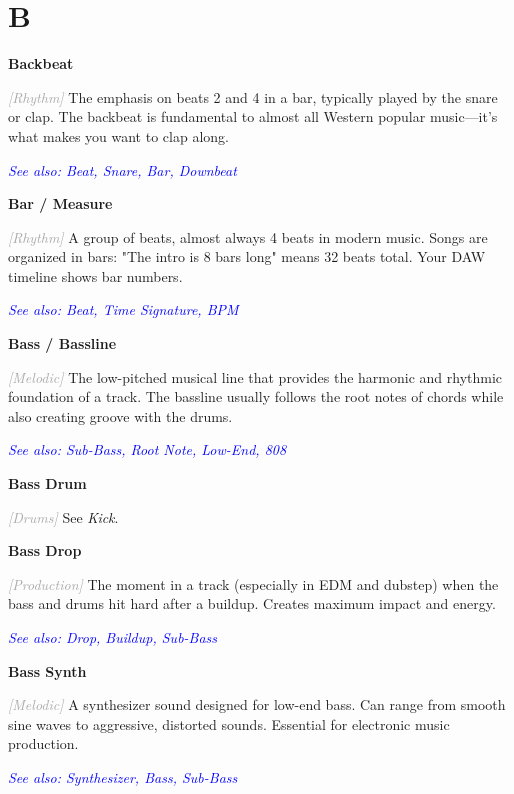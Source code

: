 \documentclass[11pt,letterpaper]{article}
\newcommand{\term}[1]{\textbf{\large\color{purple}#1}}
\newcommand{\category}[1]{\textcolor{darkgray}{\textit{\small [#1]}}}
\newcommand{\seealso}[1]{\textcolor{blue}{\textit{See also: #1}}}
\newenvironment{termdef}[1]
  {\noindent\term{#1}\par\nopagebreak}
  {\par\vspace{0.3em}}
\begin{document}

\section*{B}

\begin{termdef}{Backbeat}
\category{Rhythm}
The emphasis on beats 2 and 4 in a bar, typically played by the snare or clap. The backbeat is fundamental to almost all Western popular music—it's what makes you want to clap along.

\seealso{Beat, Snare, Bar, Downbeat}
\end{termdef}

\begin{termdef}{Bar / Measure}
\category{Rhythm}
A group of beats, almost always 4 beats in modern music. Songs are organized in bars: "The intro is 8 bars long" means 32 beats total. Your DAW timeline shows bar numbers.

\seealso{Beat, Time Signature, BPM}
\end{termdef}

\begin{termdef}{Bass / Bassline}
\category{Melodic}
The low-pitched musical line that provides the harmonic and rhythmic foundation of a track. The bassline usually follows the root notes of chords while also creating groove with the drums.

\seealso{Sub-Bass, Root Note, Low-End, 808}
\end{termdef}

\begin{termdef}{Bass Drum}
\category{Drums}
See \textit{Kick}.
\end{termdef}

\begin{termdef}{Bass Drop}
\category{Production}
The moment in a track (especially in EDM and dubstep) when the bass and drums hit hard after a buildup. Creates maximum impact and energy.

\seealso{Drop, Buildup, Sub-Bass}
\end{termdef}

\begin{termdef}{Bass Synth}
\category{Melodic}
A synthesizer sound designed for low-end bass. Can range from smooth sine waves to aggressive, distorted sounds. Essential for electronic music production.

\seealso{Synthesizer, Bass, Sub-Bass}
\end{termdef}
\end{document}

